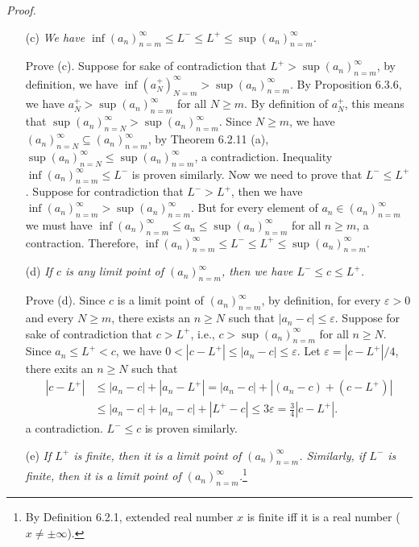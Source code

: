 \documentclass{book}
\newcommand{\pff}{\vspace{.25em}\noindent\emph{Proof.}~~}
\begin{document}
\pff
\begin{enumerate}
    \item[(c)] \emph{We have $\inf(a_n)_{n=m}^\infty\leq L^-\leq L^+\leq\sup(a_n)_{n=m}^\infty$.}

    Prove (c). Suppose for sake of contradiction that  $L^+>\sup(a_n)_{n=m}^\infty$, by definition, we have $\inf(a_N^+)_{N=m}^\infty>\sup(a_n)_{n=m}^\infty$. By Proposition 6.3.6, we have $a_N^+>\sup(a_n)_{n=m}^\infty$ for all $N\geq m$. By definition of $a_N^+$, this means that $\sup(a_n)_{n=N}^\infty>\sup(a_n)_{n=m}^\infty$. Since $N\geq m$, we have $(a_n)_{n=N}^\infty\subseteq(a_n)_{n=m}^\infty$, by Theorem 6.2.11 (a), $\sup(a_n)_{n=N}^\infty\leq\sup(a_n)_{n=m}^\infty$, a contradiction. Inequality $\inf(a_n)_{n=m}^\infty\leq L^-$ is proven similarly. Now we need to prove that $L^-\leq L^+$. Suppose for contradiction that $L^->L^+$, then we have $\inf(a_n)_{n=m}^\infty>\sup(a_n)_{n=m}^\infty$. But for every element of $a_n\in(a_n)_{n=m}^\infty$ we must have $\inf(a_n)_{n=m}^\infty\leq a_n\leq\sup(a_n)_{n=m}^\infty$ for all $n\geq m$, a contraction. Therefore, $\inf(a_n)_{n=m}^\infty\leq L^-\leq L^+\leq\sup(a_n)_{n=m}^\infty$.

    \item[(d)] \emph{If $c$ is any limit point of $(a_n)_{n=m}^\infty$, then we have $L^-\leq c\leq L^+$.}

    Prove (d). Since $c$ is a limit point of $(a_n)_{n=m}^\infty$, by definition, for every $\varepsilon>0$ and every $N\geq m$, there exists an $n\geq N$ such that $|a_n-c|\leq\varepsilon$. Suppose for sake of contradiction that $c>L^+$, i.e., $c>\sup(a_n)_{n=m}^\infty$ for all $n\geq N$. Since $a_n\leq L^+<c$, we have $0<|c-L^+|\leq|a_n-c|\leq\varepsilon$. Let $\varepsilon=|c-L^+|/4$, there exits an $n\geq N$ such that
        \begin{align*}
            |c-L^+|&\leq|a_n-c|+|a_n-L^+|=|a_n-c|+|(a_n-c)+(c-L^+)|\\
            &\leq|a_n-c|+|a_n-c|+|L^+-c|\leq 3\varepsilon=\frac{3}{4}|c-L^+|.
        \end{align*}
    a contradiction. $L^-\leq c$ is proven similarly.

    \item[(e)] \emph{If $L^+$ is finite, then it is a limit point of $(a_n)_{n=m}^\infty$. Similarly, if $L^-$ is finite, then it is a limit point of $(a_n)_{n=m}^\infty$.}\footnote{By Definition 6.2.1, extended real number $x$ is finite iff it is a real number ($x\neq\pm\infty$).}
    

\end{enumerate}
\end{document}
